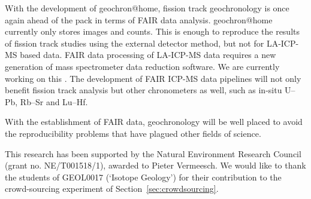 \documentclass[gchron, manuscript]{copernicus}
\begin{document}
With the development of geochron@home, fission track geochronology is
once again ahead of the pack in terms of FAIR data analysis.
geochron@home currently only stores images and counts. This is enough
to reproduce the results of fission track studies using the external
detector method, but not for LA-ICP-MS based data. FAIR data
processing of LA-ICP-MS data requires a new generation of mass
spectrometer data reduction software. We are currently working on this
\citep{vermeesch2025b}. The development of FAIR ICP-MS data pipelines
will not only benefit fission track analysis but other chronometers as
well, such as in-situ U--Pb, Rb--Sr and Lu--Hf.\medskip

With the establishment of FAIR data, geochronology will be well placed
to avoid the reproducibility problems that have plagued other fields
of science.







\begin{acknowledgements}
This research has been supported by the Natural Environment Research
Council (grant no. NE/T001518/1), awarded to Pieter Vermeesch. We would like
to thank the students of GEOL0017 (`Isotope Geology') for their contribution
to the crowd-sourcing experiment of Section~\ref{sec:crowdsourcing}.
\end{acknowledgements}



\end{document}
